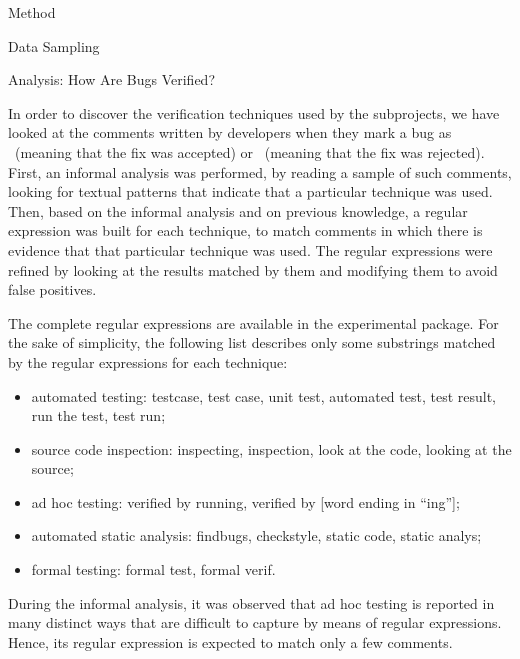 \begin{section}{Method}
\begin{subsection}{Data Sampling}
\end{subsection}

\begin{subsection}{Analysis: How Are Bugs Verified?}

	In order to discover the verification techniques used by the subprojects, we have looked at the comments written by developers when they mark a bug as \VERIFIED\ (meaning that the fix was accepted) or \REOPENED\ (meaning that the fix was rejected). First, an informal analysis was performed, by reading a sample of such comments, looking for textual patterns that indicate that a particular technique was used. Then, based on the informal analysis and on previous knowledge, a regular expression was built for each technique, to match comments in which there is evidence that that particular technique was used. The regular expressions were refined by looking at the results matched by them and modifying them to avoid false positives. 
	
	The complete regular expressions are available in the experimental package. For the sake of simplicity, the following list describes only some substrings matched by the regular expressions for each technique:
		
	\begin{itemize}
		\item automated testing: testcase, test case, unit test, automated test, test result, run the test, test run;
		\item source code inspection: inspecting, inspection, look at the code, looking at the source;
		\item ad hoc testing: verified by running, verified by [word ending in ``ing''];
		\item automated static analysis: findbugs, checkstyle, static code, static analys;
		\item formal testing: formal test, formal verif.
	\end{itemize}
	
	
	During the informal analysis, it was observed that ad hoc testing is reported in many distinct ways that are difficult to capture by means of regular expressions. Hence, its regular expression is expected to match only a few comments.
	
	

\end{subsection}
\end{section}

